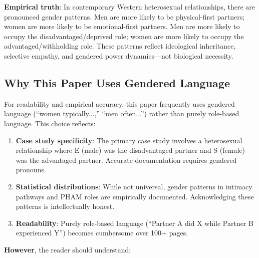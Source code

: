 \documentclass[12pt,openany]{book}
\numberwithin{equation}{chapter}
\begin{document}
\textbf{Empirical truth}: In contemporary Western heterosexual relationships, there are pronounced gender patterns. Men are more likely to be physical-first partners; women are more likely to be emotional-first partners. Men are more likely to occupy the disadvantaged/deprived role; women are more likely to occupy the advantaged/withholding role. These patterns reflect ideological inheritance, selective empathy, and gendered power dynamics---not biological necessity.

\subsection{Why This Paper Uses Gendered Language}

For readability and empirical accuracy, this paper frequently uses gendered language (``women typically...,'' ``men often...'') rather than purely role-based language. This choice reflects:

\begin{enumerate}
    \item \textbf{Case study specificity}: The primary case study involves a heterosexual relationship where E (male) was the disadvantaged partner and S (female) was the advantaged partner. Accurate documentation requires gendered pronouns.
    
    \item \textbf{Statistical distributions}: While not universal, gender patterns in intimacy pathways and PHAM roles are empirically documented. Acknowledging these patterns is intellectually honest.
    
    \item \textbf{Readability}: Purely role-based language (``Partner A did X while Partner B experienced Y'') becomes cumbersome over 100+ pages.
\end{enumerate}

\textbf{However}, the reader should understand:
\end{document}
